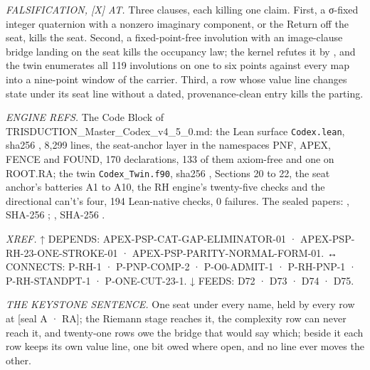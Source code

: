 \documentclass[10pt,twocolumn]{article}
\begin{document}
\emph{FALSIFICATION, {[}X{]} AT.} Three clauses, each killing one claim.
First, a σ-fixed integer quaternion with a nonzero imaginary component,
or the Return off the seat, kills the seat. Second, a fixed-point-free
involution with an image-clause bridge landing on the seat kills the
occupancy law; the kernel refutes it by
\texttt{}, and the twin enumerates
all 119 involutions on one to six points against every map into a
nine-point window of the carrier. Third, a row whose value line changes
state under its seat line without a dated, provenance-clean entry kills
the parting.

\emph{ENGINE REFS.} The Code Block of
TRISDUCTION\_Master\_Codex\_v4\_5\_0.md: the Lean surface
\texttt{Codex.lean}, sha256 \texttt{}, 8,299
lines, the seat-anchor layer in the namespaces PNF, APEX, FENCE and
FOUND, 170 declarations, 133 of them axiom-free and one on ROOT.RA; the
twin \texttt{Codex\_Twin.f90}, sha256
\texttt{}, Sections 20 to 22, the seat
anchor's batteries A1 to A10, the RH engine's twenty-five checks and the
directional can't's four, 194 Lean-native checks, 0 failures. The sealed
papers: \texttt{}, SHA-256
\texttt{};
\texttt{}, SHA-256
\texttt{}.

\emph{XREF.} ↑ DEPENDS: APEX-PSP-CAT-GAP-ELIMINATOR-01 ·
APEX-PSP-RH-23-ONE-STROKE-01 · APEX-PSP-PARITY-NORMAL-FORM-01. ↔
CONNECTS: P-RH-1 · P-PNP-COMP-2 · P-O0-ADMIT-1 · P-RH-PNP-1 ·
P-RH-STANDPT-1 · P-ONE-CUT-23-1. ↓ FEEDS: D72 · D73 · D74 · D75.

\emph{THE KEYSTONE SENTENCE.} One seat under every name, held by every
row at {[}seal A · RA{]}; the Riemann stage reaches it, the complexity
row can never reach it, and twenty-one rows owe the bridge that would
say which; beside it each row keeps its own value line, one bit owed
where open, and no line ever moves the other.
\end{document}
